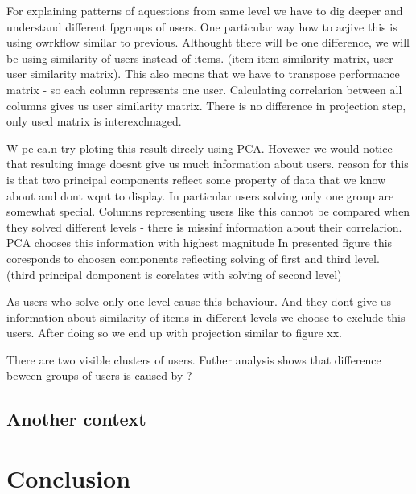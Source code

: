 \documentclass[
  digital, %
  table,   %
  nolof,     %
  nolot,     %
  nocover
]{fithesis3}
\begin{document}

For explaining patterns of aquestions from same level we have to dig
deeper and understand different fpgroups of users. One particular way
how to acjive this is using owrkflow similar to previous. Althought
there will be one difference, we will be using similarity of users
instead of items. (item-item similarity matrix, user-user similarity
matrix). This also meqns that we have to transpose performance matrix -
so each column represents one user. Calculating correlarion between all
columns gives us user similarity matrix. There is no difference in
projection step, only used matrix is interexchnaged.

W pe ca.n try ploting this result direcly using PCA. Hovewer we would
notice that resulting image doesnt give us much information about users.
reason for this is that two principal components reflect some property
of data that we know about and dont wqnt to display. In particular users
solving only one group are somewhat special. Columns representing users
like this cannot be compared when they solved different levels - there
is missinf information about their correlarion. PCA chooses this
information with highest magnitude In presented figure this coresponds
to choosen components reflecting solving of first and third level.
(third principal domponent is corelates with solving of second level)

As users who solve only one level cause this behaviour. And they dont
give us information about similarity of items in different levels we
choose to exclude this users. After doing so we end up with projection
similar to figure xx.

There are two visible clusters of users. Futher analysis shows that
difference beween groups of users is caused by ?

\subsection{Another context}\label{another-context}



\section{Conclusion}\label{conclusion}

\end{document}
